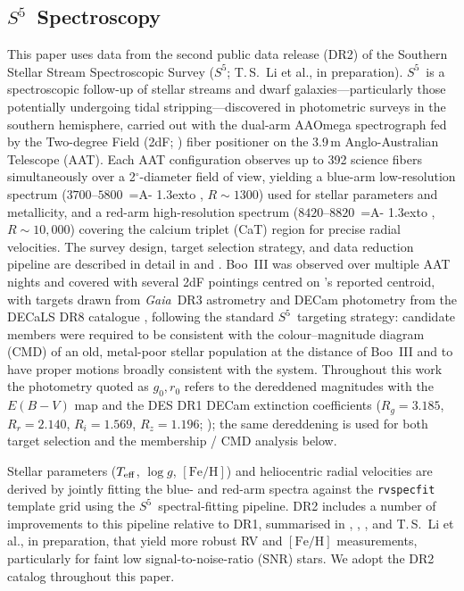 \documentclass[twocolumn, apj, numberedappendix, appendixfloats]{openjournal_dhayaa}
\renewcommand{\AA}{%
  \leavevmode\setbox0=\hbox{A}\copy0\kern-\wd0
  \raise1.3ex\hbox to\wd0{\hss{\fontsize{6}{6}\selectfont$\circ$}\hss\kern.01em\kern.04em}%
}
\newcommand{\SSSSS}{${S}^5$\xspace}
\newcommand{\gaia}{\textit{Gaia}\xspace}
\begin{document}
\subsection{\SSSSS\ Spectroscopy}
This paper uses data from the second public data release (DR2) of the Southern Stellar Stream Spectroscopic Survey (\SSSSS; T.\,S.~Li et al., in preparation).
\SSSSS\ is a spectroscopic follow-up of stellar streams and dwarf galaxies---particularly those potentially undergoing tidal stripping---discovered in photometric surveys in the southern hemisphere, carried out with the dual-arm AAOmega spectrograph \citep{Sharp2006} fed by the Two-degree Field (2dF; \citealt{Lewis2002}) fiber positioner on the 3.9\,m Anglo-Australian Telescope (AAT).
Each AAT configuration observes up to 392 science fibers simultaneously over a 2\ensuremath{^{\circ}}-diameter field of view, yielding a blue-arm low-resolution spectrum ($3700$--$5800$\,\AA, $R \sim 1300$) used for stellar parameters and metallicity, and a red-arm high-resolution spectrum ($8420$--$8820$\,\AA, $R \sim 10{,}000$) covering the calcium triplet (CaT) region for precise radial velocities.
The survey design, target selection strategy, and data reduction pipeline are described in detail in \citet{Li2019} and \citet{Li2022}.
Boo~III was observed over multiple AAT nights and covered with several 2dF pointings centred on \citet{Grillmair2009}'s reported centroid, with targets drawn from \gaia\ DR3 \citep{GaiaMission, GaiaDR3} astrometry and DECam photometry from the DECaLS DR8 catalogue \citep{DECaLS}, following the standard \SSSSS\ targeting strategy: candidate members were required to be consistent with the colour--magnitude diagram (CMD) of an old, metal-poor stellar population at the distance of Boo~III and to have proper motions broadly consistent with the system. Throughout this work the photometry quoted as $g_0, r_0$ refers to the dereddened magnitudes with the \citet{Schlegel1998} $E(B-V)$ map and the DES DR1 DECam extinction coefficients ($R_g = 3.185$, $R_r = 2.140$, $R_i = 1.569$, $R_z = 1.196$; \citealt{Abbott2018_DESDR1}); the same dereddening is used for both target selection and the membership / CMD analysis below.

Stellar parameters ($T_{\rm eff}$, $\log g$, $[\mathrm{Fe/H}]$) and heliocentric radial velocities are derived by jointly fitting the blue- and red-arm spectra against the \texttt{rvspecfit} template grid \citep{Koposov2019_rvspecfit} using the \SSSSS\ spectral-fitting pipeline. DR2 includes a number of improvements to this pipeline relative to DR1, summarised in \citet{Ji2021}, \citet{Sandford2025}, \citet{Limberg2025}, and T.\,S.~Li et al., in preparation, that yield more robust RV and $[\mathrm{Fe/H}]$ measurements, particularly for faint low signal-to-noise-ratio (SNR) stars.
We adopt the DR2 catalog throughout this paper.
\end{document}
